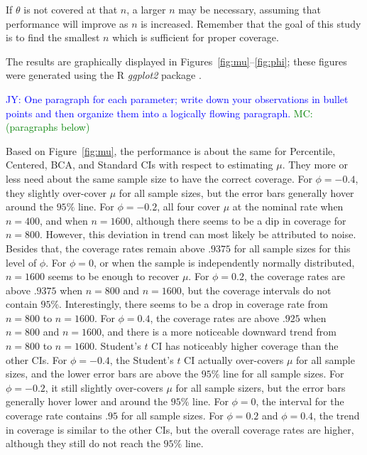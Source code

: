 \documentclass[12pt, letterpaper, titlepage]{article}
\newcommand{\jy}[1]{\textcolor{blue}{JY: #1}}
\newcommand{\mc}[1]{\textcolor{green}{MC: (#1)}}
\begin{document}
If $\theta$ is not covered at that $n$, a larger $n$ may be
necessary, assuming that performance will improve as $n$ is increased.
Remember that
the goal of this study is to find the smallest $n$ which is sufficient for
proper coverage.


The results are graphically displayed in Figures~\ref{fig:mu}--\ref{fig:phi};
these figures were generated using the R \textsl{ggplot2} package
\citep{ggplot2}.



\jy{One paragraph for each parameter; write down your observations in bullet
  points and then organize them into a logically flowing paragraph.}
\mc{paragraphs below}

Based on Figure~\ref{fig:mu}, 
the performance is about the same for Percentile, Centered, BCA, and 
Standard CIs with respect to estimating $\mu$. They more or less need
about the same sample size to have the correct coverage. For $\phi = -0.4$, 
they slightly over-cover $\mu$ for all sample sizes, but the error bars generally 
hover around the $95\%$ line. For $\phi = -0.2$, all four cover $\mu$ at the nominal 
rate when $n = 400$, and when $n = 1600$, although there seems to be a dip in 
coverage for $n = 800$. However, this deviation in trend can most likely be 
attributed to noise. Besides that, the coverage rates remain above $.9375$ 
for all sample sizes for this level of $\phi$. For $\phi = 0$, or when the 
sample is independently normally distributed, $n = 1600$ seems to 
be enough to recover $\mu$. For $\phi = 0.2$, the coverage rates are above 
$.9375$ when $n = 800$ and $n = 1600$, but the coverage intervals do not contain
$95\%$. Interestingly, there seems to be a drop in coverage rate from 
$n = 800$ to $n = 1600$. For $\phi = 0.4$, the coverage rates are above $.925$
when $n = 800$ and $n = 1600$, and there is a more noticeable downward 
trend from $n = 800$ to $n = 1600$. Student's $t$ CI has noticeably higher coverage
than the other CIs. For $\phi = -0.4$, the Student's $t$ CI actually 
over-covers $\mu$ for all sample sizes, and the lower error bars
are above the $95\%$ line for all sample sizes. For $\phi = -0.2$, it still slightly 
over-covers $\mu$ for all sample sizers, but the error bars generally hover
lower and around the $95\%$ line. For $\phi = 0$, the interval for the 
coverage rate contains $.95$ for all sample sizes. For $\phi = 0.2$ and 
$\phi = 0.4$, the trend in coverage is similar to the other CIs, but 
the overall coverage rates are higher, although they still do not reach the $95\%$
line. 
\end{document}
